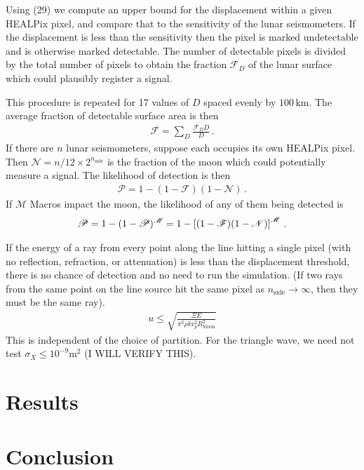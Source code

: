 \documentclass[prd,reprint,10pt,tightenlines]{revtex4-1}
\newcommand*\scr[1]{\mathscr{#1}}
\newcommand*\te[1]{\text{#1}}
\newcommand*\ps[1]{\left[#1\right]}
\newcommand*\f[2]{\frac{#1}{#2}}
\begin{document}
Using (29) we compute an upper bound for the displacement within a given HEALPix pixel, and compare that to the sensitivity of the lunar seismometers. If the displacement is less than the sensitivity then the pixel is marked undetectable and is otherwise marked detectable. The number of detectable pixels is divided by the total number of pixels to obtain the fraction $\scr F_D$ of the lunar surface which could plausibly register a signal. 

This procedure is repeated for 17 values of $D$ spaced evenly by $100\,\te{km}$. The average fraction of detectable surface area is then
\begin{align}
\scr F = \sum_D\f{\scr F_D D}{D}\,.
\end{align}
If there are $n$ lunar seismometers, suppose each occupies its own HEALPix pixel. Then $\scr N = n/12\times 2^{n_\te{side}}$ is the fraction of the moon which could potentially measure a signal. The likelihood of detection is then
\begin{align}
\scr P = 1-(1-\scr F)(1-\scr N)\,.
\end{align}
If $\scr M$ Macros impact the moon, the likelihood of any of them being detected is
\begin{align}
{\cal P} = 1-(1-\scr P)^\scr{M} = 1-\ps{(1-\scr F)(1-\scr N)}^\scr M\,.
\end{align}

If the energy of a ray from every point along the line hitting a single pixel (with no reflection, refraction, or attenuation) is less than the displacement threshold, there is no chance of detection and no need to run the simulation. (If two rays from the same point on the line source hit the same pixel as $n_\te{side}\to\infty$, then they must be the same ray).
\begin{align}
u\leq\sqrt{\f{\Xi E}{\pi^2\rho k v_p^2 R_\te{Moon}^2}}
\end{align}
This is independent of the choice of partition. For the triangle wave, we need not test $\sigma_X\leq10^{-9}\te{m}^2$ (I WILL VERIFY THIS).
\section{Results}

\section{Conclusion}
\end{document}
